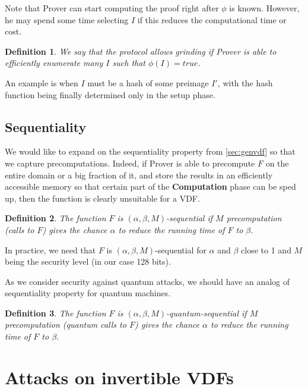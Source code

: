 \documentclass{article}
\newtheorem{definition}{Definition}
\begin{document}
Note that Prover can start computing the proof right after $\phi$ is known. However, he may spend some time selecting $I$ if this reduces the computational time or cost.

\begin{definition}
We say that the protocol \emph{allows grinding} if Prover is able to efficiently enumerate many $I$ such that
$\phi(I)=true$.
\end{definition}
 An example is when $I$ must be a hash of some preimage $I'$, with the hash function being finally determined only in the setup phase.


\subsection{ Sequentiality}

We would like to expand on the sequentiality property from \cref{sec:genvdf} so that we capture precomputations. Indeed, if Prover is able to precompute $F$ on the entire domain or a big fraction of it, and store the results in an efficiently accessible memory so that certain part of the \textbf{Computation} phase can be sped up, then the function is clearly unsuitable for a VDF.

\begin{definition}
The function $F$ is \emph{$(\alpha,\beta,M)$-sequential} if $M$ precomputation (calls to $F$) gives the chance $\alpha$ to reduce the running time of $F$ to $\beta$.

\end{definition}

In practice, we need that $F$ is $(\alpha,\beta,M)$-sequential for $\alpha$ and $\beta$ close to 1 and $M$ being the security level (in our case 128 bits).

As we consider security against quantum attacks, we should have an analog of sequentiality property for quantum machines.


\begin{definition}
The function $F$ is \emph{$(\alpha,\beta,M)$-quantum-sequential} if $M$ precomputation (quantum calls to $F$) gives the chance $\alpha$ to reduce the running time of $F$ to $\beta$.

\end{definition}


\section{  Attacks on invertible VDFs}
\end{document}
